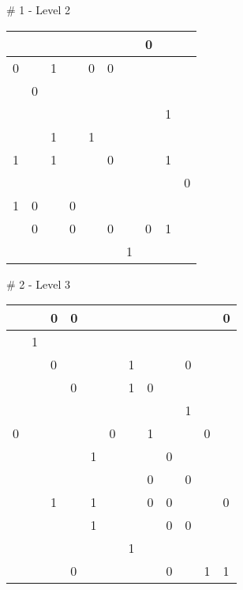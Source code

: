 \# 1 - Level 2 \newline
\begin{tabular}{|m{\collen}|m{\collen}|m{\collen}|m{\collen}|m{\collen}|m{\collen}|m{\collen}|m{\collen}|m{\collen}|m{\collen}|}
\hline
    &   &   &   &   &   &   & 0 &   &   \\
\hline
  0 &   & 1 &   & 0 & 0 &   &   &   &   \\
\hline
    & 0 &   &   &   &   &   &   &   &   \\
\hline
    &   &   &   &   &   &   &   & 1 &   \\
\hline
    &   & 1 &   & 1 &   &   &   &   &   \\
\hline
  1 &   & 1 &   &   & 0 &   &   & 1 &   \\
\hline
    &   &   &   &   &   &   &   &   & 0 \\
\hline
  1 & 0 &   & 0 &   &   &   &   &   &   \\
\hline
    & 0 &   & 0 &   & 0 &   & 0 & 1 &   \\
\hline
    &   &   &   &   &   & 1 &   &   &   \\
\hline
\end{tabular}


\medskip

\# 2 - Level 3 \newline
\begin{tabular}{|m{\collen}|m{\collen}|m{\collen}|m{\collen}|m{\collen}|m{\collen}|m{\collen}|m{\collen}|m{\collen}|m{\collen}|m{\collen}|m{\collen}|}
\hline
    &   & 0 & 0 &   &   &   &   &   &   &   & 0 \\
\hline
    & 1 &   &   &   &   &   &   &   &   &   &   \\
\hline
    &   & 0 &   &   &   & 1 &   &   & 0 &   &   \\
\hline
    &   &   & 0 &   &   & 1 & 0 &   &   &   &   \\
\hline
    &   &   &   &   &   &   &   &   & 1 &   &   \\
\hline
  0 &   &   &   &   & 0 &   & 1 &   &   & 0 &   \\
\hline
    &   &   &   & 1 &   &   &   & 0 &   &   &   \\
\hline
    &   &   &   &   &   &   & 0 &   & 0 &   &   \\
\hline
    &   & 1 &   & 1 &   &   & 0 & 0 &   &   & 0 \\
\hline
    &   &   &   & 1 &   &   &   & 0 & 0 &   &   \\
\hline
    &   &   &   &   &   & 1 &   &   &   &   &   \\
\hline
    &   &   & 0 &   &   &   &   & 0 &   & 1 & 1 \\
\hline
\end{tabular}



